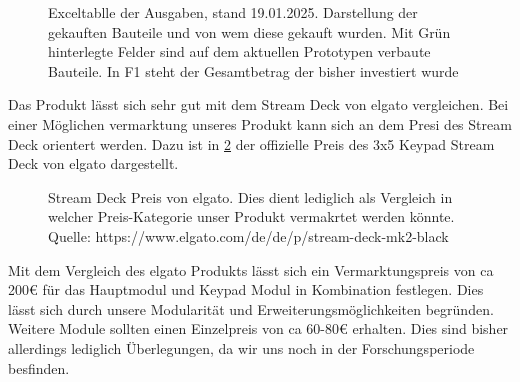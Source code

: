 \begin{figure}[H]
    \centering    
    \caption{Exceltablle der Ausgaben, stand 19.01.2025. Darstellung der gekauften Bauteile und von wem diese gekauft wurden. Mit Grün hinterlegte Felder sind auf dem aktuellen Prototypen verbaute Bauteile. In F1 steht der Gesamtbetrag der bisher investiert wurde}
    \label{Finanzen}
\end{figure}

Das Produkt lässt sich sehr gut mit dem Stream Deck von elgato vergleichen. Bei einer Möglichen vermarktung unseres Produkt kann sich an dem Presi des Stream Deck orientert werden. Dazu ist in \ref{streamDeck} der offizielle Preis des 3x5 Keypad Stream Deck von elgato dargestellt.

\begin{figure}[H]
    \centering    
    \caption{Stream Deck Preis von elgato. Dies dient lediglich als Vergleich in welcher Preis-Kategorie unser Produkt vermakrtet werden könnte. Quelle: https://www.elgato.com/de/de/p/stream-deck-mk2-black}
    \label{streamDeck}
\end{figure}

Mit dem Vergleich des elgato Produkts lässt sich ein Vermarktungspreis von ca 200€ für das Hauptmodul und Keypad Modul in Kombination festlegen. Dies lässt sich durch unsere Modularität und Erweiterungsmöglichkeiten begründen. Weitere Module sollten einen Einzelpreis von ca 60-80€ erhalten.
Dies sind bisher allerdings lediglich Überlegungen, da wir uns noch in der Forschungsperiode besfinden.

